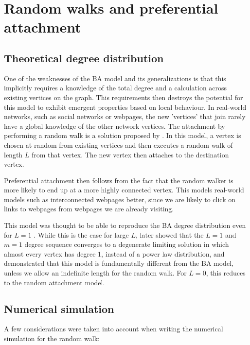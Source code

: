\section{Random walks and preferential attachment}\label{section:random-walk}

\subsection{Theoretical degree distribution}
One of the weaknesses of the BA model and its generalizations is that this implicitly requires a knowledge of the total degree and a calculation across existing vertices on the graph. This requirements then destroys the potential for this model to exhibit emergent properties based on local behaviour. In real-world networks, such as social networks or webpages, the new 'vertices' that join rarely have a global knowledge of the other network vertices. The attachment by performing a random walk is a solution proposed by \citet{Saramaki2004}. In this model, a vertex is chosen at random from existing vertices and then executes a random walk of length $L$ from that vertex. The new vertex then attaches to the destination vertex. 

Preferential attachment then follows from the fact that the random walker is more likely to end up at a more highly connected vertex. This models real-world models such as interconnected webpages better, since we are likely to click on links to webpages from webpages we are already visiting. 

This model was thought to be able to reproduce the BA degree distribution even for $L=1$ \citep{Saramaki2004,J.P.Saramaki2004}. While this is the case for large $L$, \citet{Cannings2013} later showed that the $L=1$ and $m=1$ degree sequence converges to a degenerate limiting solution in which almost every vertex has degree 1, instead of a power law distribution, and demonstrated that this model is fundamentally different from the BA model, unless we allow an indefinite length for the random walk. For $L = 0$, this reduces to the random attachment model. 

\subsection{Numerical simulation}

A few considerations were taken into account when writing the numerical simulation for the random walk:

